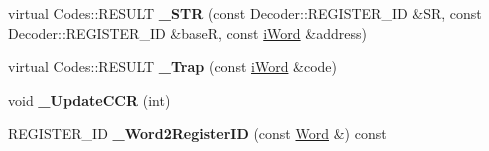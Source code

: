 \begin{DoxyCompactItemize}
\item 
\hypertarget{classWi11_a0f6249d939e8f1aa2219a0f7c5e732e6}{
virtual Codes::RESULT {\bfseries \_\-STR} (const Decoder::REGISTER\_\-ID \&SR, const Decoder::REGISTER\_\-ID \&baseR, const \hyperlink{classiWord}{iWord} \&address)}
\label{classWi11_a0f6249d939e8f1aa2219a0f7c5e732e6}

\item 
\hypertarget{classWi11_ac62ce0a9f8df8dacab577cee514cb199}{
virtual Codes::RESULT {\bfseries \_\-Trap} (const \hyperlink{classiWord}{iWord} \&code)}
\label{classWi11_ac62ce0a9f8df8dacab577cee514cb199}

\item 
\hypertarget{classWi11_a55dd619a7cf329849f5a3b22e37d00ed}{
void {\bfseries \_\-UpdateCCR} (int)}
\label{classWi11_a55dd619a7cf329849f5a3b22e37d00ed}

\item 
\hypertarget{classWi11_abba9724054093a987468c0b14bf8fcda}{
REGISTER\_\-ID {\bfseries \_\-Word2RegisterID} (const \hyperlink{classWord}{Word} \&) const }
\label{classWi11_abba9724054093a987468c0b14bf8fcda}

\end{DoxyCompactItemize}
